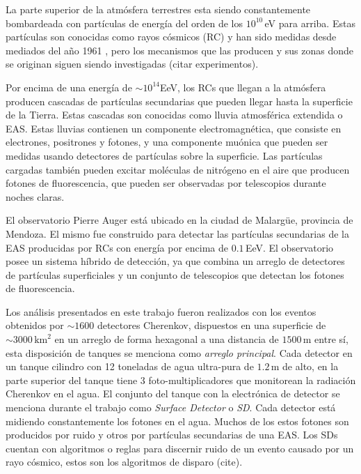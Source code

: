 
La parte superior de la atmósfera terrestres esta siendo constantemente bombardeada con partículas de energía del orden de los $10^10\,$eV para arriba. Estas partículas son conocidas como rayos cósmicos (RC) y han sido medidas desde mediados del año 1961 \cite{linsley1961extremely}, pero los mecanismos que las producen y sus zonas donde se originan siguen siendo investigadas (citar experimentos). %


Por encima de una energía de $\sim10^14$EeV, los RCs que llegan a la atmósfera producen cascadas de partículas secundarias que pueden llegar hasta la superficie  de la Tierra. Estas cascadas son conocidas como lluvia atmosférica extendida o EAS. Estas lluvias contienen un componente electromagnética, que consiste en electrones, positrones y fotones, y una componente muónica que pueden ser medidas usando detectores de partículas sobre la superficie. Las partículas cargadas también pueden excitar moléculas de nitrógeno en el aire que producen fotones de fluorescencia, que pueden ser observadas por telescopios durante noches claras.


El observatorio Pierre Auger está ubicado en la ciudad de Malargüe, provincia de Mendoza. El mismo fue construido para detectar las partículas secundarias de la EAS producidas por RCs con energía por encima de $0.1\,$EeV. El observatorio posee un sistema híbrido de detección, ya que combina un arreglo de detectores de partículas superficiales y un conjunto de telescopios que detectan los fotones de fluorescencia.


Los análisis presentados en este trabajo fueron realizados con los eventos obtenidos por $\sim 1600$ detectores Cherenkov, dispuestos en una superficie de $\sim 3000\,\text{km}^2$ en un arreglo de forma hexagonal a una distancia de $1500\,$m entre sí, esta disposición de tanques se menciona como \textit{arreglo principal}. Cada detector en un tanque cilindro con 12 toneladas de agua ultra-pura de $1.2\,$m de alto, en la parte superior del tanque tiene 3 foto-multiplicadores que monitorean la radiación Cherenkov en el agua. El conjunto del tanque con la electrónica de detector se menciona durante el trabajo como \textit{Surface Detector} o \textit{SD}.  Cada detector está midiendo constantemente los fotones en el agua. Muchos de los estos fotones son producidos por ruido y otros por partículas secundarias de una EAS. Los SDs cuentan con algoritmos o reglas para discernir ruido de un evento causado por un rayo cósmico, estos son los algoritmos de disparo (cite).


